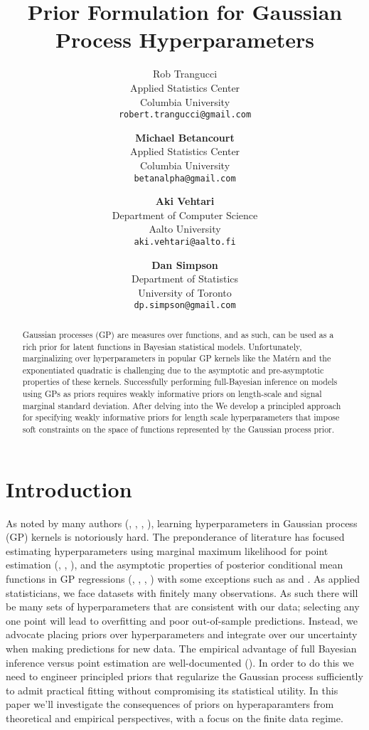 \documentclass{article}
\title{Prior Formulation for Gaussian Process Hyperparameters}
\author{
  Rob Trangucci \\
  Applied Statistics Center\\
  Columbia University\\
  \texttt{robert.trangucci@gmail.com} 
  \and
  \textbf{Michael Betancourt} \\
  Applied Statistics Center \\
  Columbia University \\
  \texttt{betanalpha@gmail.com} 
  \and
  \textbf{Aki Vehtari} \\
  Department of Computer Science \\
  Aalto University \\
  \texttt{aki.vehtari@aalto.fi} 
  \and
  \textbf{Dan Simpson} \\
  Department of Statistics \\
  University of Toronto \\
  \texttt{dp.simpson@gmail.com} 
}
\begin{document}

\maketitle

\begin{abstract}
  Gaussian processes (GP) are measures over functions, and as such, can be used
  as a rich prior for latent functions in Bayesian statistical models.
  Unfortunately, marginalizing over hyperparameters in popular GP kernels like
  the Mat\'{e}rn and the exponentiated quadratic is challenging due to the
  asymptotic and pre-asymptotic properties of these kernels. Successfully
  performing full-Bayesian inference on models using GPs as priors requires
  weakly informative priors on length-scale and signal marginal standard
  deviation. After delving into the We develop a principled approach for
  specifying weakly informative priors for length scale hyperparameters that
  impose soft constraints on the space of functions represented by the Gaussian
  process prior.
\end{abstract}


\section{Introduction}

As noted by many authors (\citet{flaxman2015fast},
\citet{stein2012interpolation}, \citet{rasmussen2005gaussian},
\citet{fuglstad2015interpretable}), learning hyperparameters in Gaussian
process (GP) kernels is notoriously hard. The preponderance of literature has
focused estimating hyperparameters using marginal maximum likelihood for point
estimation (\citet{stein2012interpolation}, \citet{rasmussen2005gaussian},
\citet{warnes1987problems}), and the asymptotic properties of posterior
conditional mean functions in GP regressions (\citet{seeger2008information},
\citet{stein2012interpolation}, \citet{rasmussen2005gaussian},
\citet{williams2000upper}) with some exceptions such as
\citet{neal1998regression} and \citet{vanhatalo2013gpstuff}. As applied
statisticians, we face datasets with finitely many observations. As such there
will be many sets of hyperparameters that are consistent with our data;
selecting any one point will lead to overfitting and poor out-of-sample
predictions. Instead, we advocate placing priors over hyperparameters and
integrate over our uncertainty when making predictions for new data. The
empirical advantage of full Bayesian inference versus point estimation are
well-documented (\citet{vehtariloo}). In order to do this we need to engineer
principled priors that regularize the Gaussian process sufficiently to admit
practical fitting without compromising its statistical utility. In this paper
we'll investigate the consequences of priors on hyperaparamters from
theoretical and empirical perspectives, with a focus on the finite data regime.
\end{document}
